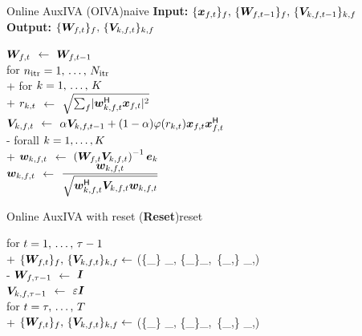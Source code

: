 \documentclass[sip,biber]{now-journal}
\begin{document}
\begin{algorithm}{Online AuxIVA (OIVA)}{naive}
  \textbf{Input:} $\{\Obs _{\ft}\} _{\freq},\, \{\Demix _{\ft[-1]}\}_{\freq},\, \{\cov _{\src,\ft[-1]}\}_{\src,\freq}$\\
  \textbf{Output:} $\{\Demix _{\ft}\}_{\freq},\, \{\cov _{\src,\ft}\}_{\src,\freq}$
  \begin{pseudo}
    {$\Demix _{\ft}$} $\gets$ $\Demix _{\ft[-1]}$ \ct{$(\forall \freq)$} \\
    for $n _{\mathrm{itr}} = 1,\, \dots,\, N _{\mathrm{itr}}$ \\+
      for $k = 1,\, \dots,\, K$ \\+
        {$r _{k,t}$} $\gets$ $\sqrt{\sum _{\freq} \abs{\demix _{\src,\ft} ^{\hermite} \Obs _{\ft}} ^2}$ \\
        {$\cov _{\src,\ft}    $} $\gets$ $\forget \cov _{\src,\ft[-1]} + (1 - \forget) \weight(\var _{\src,\tframe}) \Obs _{\ft} \Obs _{\ft} ^{\hermite}$ \ct{$(\forall \freq)$}\\-
      forall $k = 1, \dots, K$ \\+
        {$\demix _{\src,\ft}$} $\gets$ $\left(\Demix _{\ft} \cov _{\src,\ft}\right) ^{-1} \eye _{\src}$ \ct{$(\forall \freq)$}\\
        {$\demix _{\src,\ft}$} $\gets$ $\dfrac{\demix _{\src,\ft}}{\sqrt{\demix _{\src,\ft} ^{\hermite} \cov _{\src,\ft} \demix _{\src,\ft}}}$ \ct{$(\forall \freq)$}
  \end{pseudo}
\end{algorithm}
\begin{algorithm}{Online AuxIVA with reset (\textbf{Reset})}{reset}
  \begin{pseudo}
    for $t = 1,\, \dots,\, \tau - 1$ \\+
      $\{\Demix _{\ft}\}_{\freq},\, \{\cov _{\src,\ft}\} _{\src,\freq} \gets$ (\{\Obs _{\ft}\} _{\freq}, \{\Demix _{\ft[-1]}\}_{\freq},\, \{\cov _{\src,\ft[-1]}\} _{\src,\freq}) \\-
    {$\bm{W} _{f,\tau - 1}$} $\gets$ $\bm{I}$ \ct{$(\forall \freq)$} \\
    {$\bm{V} _{k,f,\tau - 1}$} $\gets$ $\varepsilon \bm{I}$ \ct{$(\forall \src,\freq)$} \\
    for $t = \tau,\, \dots,\, T$ \\+
      $\{\Demix _{\ft}\}_{\freq},\, \{\cov _{\src,\ft}\} _{\src,\freq} \gets$ (\{\Obs _{\ft}\} _{\freq}, \{\Demix _{\ft[-1]}\}_{\freq},\, \{\cov _{\src,\ft[-1]}\} _{\src,\freq})
  \end{pseudo}
\end{algorithm}
\end{document}

